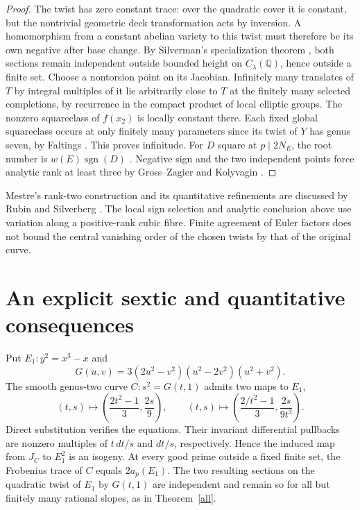 \documentclass[11pt]{article}
\newcommand{\Q}{\mathbb Q}\newcommand{\F}{\mathbb F}\newcommand{\Z}{\mathbb Z}
\begin{document}
\begin{proof}
The twist has zero constant trace: over the quadratic cover it is constant, but the nontrivial geometric deck transformation acts by inversion. A homomorphism from a constant abelian variety to this twist must therefore be its own negative after base change. By Silverman's specialization theorem \cite{silverman}, both sections remain independent outside bounded height on $C_\lambda(\Q)$, hence outside a finite set. Choose a nontorsion point on its Jacobian. Infinitely many translates of $T$ by integral multiples of it lie arbitrarily close to $T$ at the finitely many selected completions, by recurrence in the compact product of local elliptic groups. The nonzero squareclass of $f(x_2)$ is locally constant there. Each fixed global squareclass occurs at only finitely many parameters since its twist of $Y$ has genus seven, by Faltings \cite{faltings}. This proves infinitude. For $D$ square at $p\mid2N_E$, the root number is $w(E)\operatorname{sgn}(D)$ \cite{root}. Negative sign and the two independent points force analytic rank at least three by Gross--Zagier and Kolyvagin \cite{wiles}.
\end{proof}
Mestre's rank-two construction and its quantitative refinements are discussed by Rubin and Silverberg \cite{rubin}. The local sign selection and analytic conclusion above use variation along a positive-rank cubic fibre. Finite agreement of Euler factors does not bound the central vanishing order of the chosen twists by that of the original curve.

\section{An explicit sextic and quantitative consequences}
Put $E_1:y^2=x^3-x$ and
\[
 G(u,v)=3(2u^2-v^2)(u^2-2v^2)(u^2+v^2).
\]
The smooth genus-two curve $C:s^2=G(t,1)$ admits two maps to $E_1$,
\[
(t,s)\mapsto\left(\frac{2t^2-1}{3},\frac{2s}{9}\right),\qquad
(t,s)\mapsto\left(\frac{2/t^2-1}{3},\frac{2s}{9t^3}\right).
\]
Direct substitution verifies the equations. Their invariant differential pullbacks are nonzero multiples of $t\,dt/s$ and $dt/s$, respectively. Hence the induced map from $J_C$ to $E_1^2$ is an isogeny. At every good prime outside a fixed finite set, the Frobenius trace of $C$ equals $2a_p(E_1)$. The two resulting sections on the quadratic twist of $E_1$ by $G(t,1)$ are independent and remain so for all but finitely many rational slopes, as in Theorem~\ref{all}.
\end{document}
